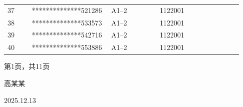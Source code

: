 \documentclass[UTF8,10pt,a4paper,fontset=fandol]{ctexart}
\newcommand{\fieldvalue}[1]{#1}
\newcommand{\handwritten}[1]{#1}
\begin{document}
\begin{tabular}{|p{0.10\linewidth}|p{0.29\linewidth}|p{0.20\linewidth}|p{0.22\linewidth}|p{0.12\linewidth}|}
&\\
\hline
37 &
\fieldvalue{**************521286}
&
\fieldvalue{A1--2}
&
\fieldvalue{1122001}
&\\
\hline
38 &
\fieldvalue{**************533573}
&
\fieldvalue{A1--2}
&
\fieldvalue{1122001}
&\\
\hline
39 &
\fieldvalue{**************542716}
&
\fieldvalue{A1--2}
&
\fieldvalue{1122001}
&\\
\hline
40 &
\fieldvalue{**************553886}
&
\fieldvalue{A1--2}
&
\fieldvalue{1122001}
&\\
\hline
\end{tabular}

\begin{flushright}
第1页，共11页

\handwritten{高某某}

\handwritten{2025.12.13}
\end{flushright}

\newpage
\end{document}
